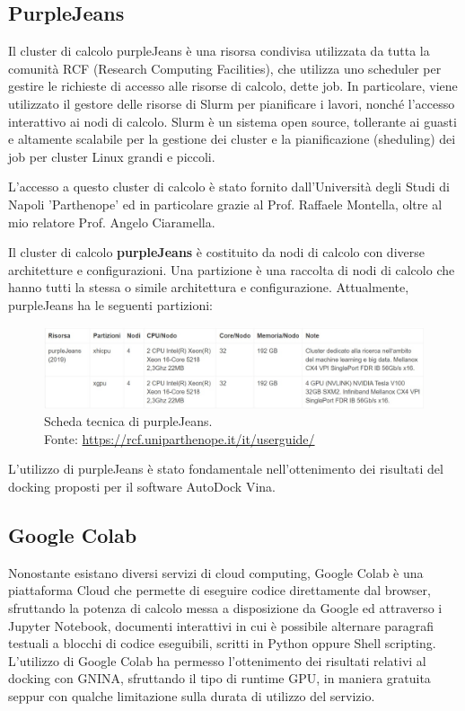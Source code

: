 \subsection{PurpleJeans}
Il cluster di calcolo purpleJeans è una risorsa condivisa utilizzata da tutta la comunità RCF (Research Computing Facilities), che utilizza uno scheduler per gestire le richieste di accesso alle risorse di calcolo, dette job. In particolare, viene utilizzato il gestore delle risorse di Slurm per pianificare i lavori, nonché l’accesso interattivo ai nodi di calcolo.
Slurm è un sistema open source, tollerante ai guasti e altamente scalabile per la gestione dei cluster e la pianificazione (sheduling) dei job per cluster Linux grandi e piccoli.

L'accesso a questo cluster di calcolo è stato fornito dall'Università degli Studi di Napoli 'Parthenope' ed in particolare grazie al Prof. Raffaele Montella, oltre al mio relatore Prof. Angelo Ciaramella.

Il cluster di calcolo \textbf{purpleJeans} è costituito da nodi di calcolo con diverse architetture e configurazioni. Una partizione è una raccolta di nodi di calcolo che hanno tutti la stessa o simile architettura e configurazione. Attualmente, purpleJeans ha le seguenti partizioni:

\begin{figure}[H]
    \centering
    \includegraphics[scale=0.5]{images/chapter2/purple_jeans.jpg}
    \caption[Scheda tecnica di purpleJeans.]{Scheda tecnica di purpleJeans. \\
    Fonte: \url{https://rcf.uniparthenope.it/it/userguide/}}
    \label{fig:purple_jeans}
\end{figure}


L'utilizzo di purpleJeans è stato fondamentale nell'ottenimento dei risultati del docking proposti per il software AutoDock Vina.

\subsection{Google Colab}
Nonostante esistano diversi servizi di cloud computing, Google Colab è una piattaforma Cloud che permette di eseguire codice direttamente dal browser, sfruttando la potenza di calcolo messa a disposizione da Google ed attraverso i Jupyter Notebook, documenti interattivi in cui è possibile alternare paragrafi testuali a blocchi di codice eseguibili, scritti in Python oppure Shell scripting. 
L'utilizzo di Google Colab ha permesso l'ottenimento dei risultati relativi al docking con GNINA, sfruttando il tipo di runtime GPU, in maniera gratuita seppur con qualche limitazione sulla durata di utilizzo del servizio. 
